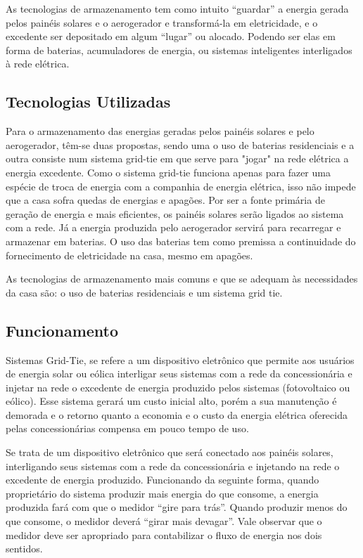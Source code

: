 	As tecnologias de armazenamento tem como intuito “guardar” a energia gerada pelos painéis solares e o aerogerador e transformá-la em eletricidade, e o excedente ser depositado em algum “lugar” ou alocado. Podendo ser elas em forma de baterias, acumuladores de energia, ou sistemas inteligentes interligados à rede elétrica.

\subsection{Tecnologias Utilizadas}

	Para o armazenamento das energias geradas pelos painéis solares e pelo aerogerador, têm-se duas propostas, sendo uma o uso de baterias residenciais e a outra consiste num sistema grid-tie em que serve para "jogar" na rede elétrica a energia excedente. Como o sistema grid-tie funciona apenas para fazer uma espécie de troca de energia com a companhia de energia elétrica, isso não impede que a casa sofra quedas de energias e apagões. Por ser a fonte primária de geração de energia e mais eficientes, os painéis solares serão ligados ao sistema com a rede. Já a energia produzida pelo aerogerador servirá para recarregar e armazenar em baterias. O uso das baterias tem como premissa a continuidade do fornecimento de eletricidade na casa, mesmo em apagões.

	As tecnologias de armazenamento mais comuns e que se adequam às necessidades da casa são: o uso de baterias residenciais e um sistema grid tie.

\subsection{Funcionamento}

	Sistemas Grid-Tie, se refere a um dispositivo eletrônico que permite aos usuários de energia solar ou eólica interligar seus sistemas com a rede da concessionária e injetar na rede o excedente de energia produzido pelos sistemas (fotovoltaico ou eólico). Esse sistema gerará um custo inicial alto, porém a sua manutenção é demorada e o retorno quanto a economia e o custo da energia elétrica oferecida pelas concessionárias compensa em pouco tempo de uso.

	Se trata de um dispositivo eletrônico que será conectado aos painéis solares, interligando seus sistemas com a rede da concessionária e injetando na rede o excedente de energia produzido. Funcionando da seguinte forma, quando proprietário do sistema produzir mais energia do que consome, a energia produzida fará com que o medidor “gire para trás”. Quando produzir menos do que consome, o medidor deverá “girar mais devagar”. Vale observar que o medidor deve ser apropriado para contabilizar o fluxo de energia nos dois sentidos.

